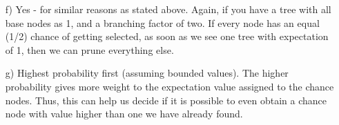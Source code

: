 \documentclass{article}
\begin{document}
\begin{enumerate}
\begin{enumerate}
\item[f)] Yes - for similar reasons as stated above.  Again, if you have a tree with all base nodes as 1, and a branching factor of two.  If every node has an equal (1/2) chance of getting selected, as soon as we see one tree with expectation of 1, then we can prune everything else.  
\item[g)] Highest probability first (assuming bounded values).  The higher probability gives more weight to the expectation value assigned to the chance nodes.  Thus, this can help us decide if it is possible to even obtain a chance node with value higher than one we have already found.
\end{enumerate}

\end{enumerate}
\end{document}
